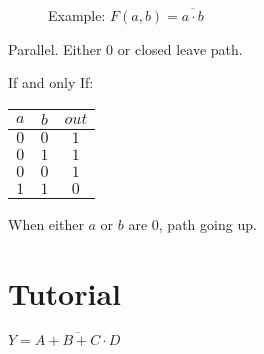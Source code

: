 \documentclass[a4paper,12pt]{article}
\begin{document}
\begin{figure}[hbt] 
\centering 



\label{NAND Gate} 

\end{figure} 

\begin{figure}[h]
\centering 



\label{NAND Gate} 

\caption{Example: $F(a, b) = \overline{a \cdot b}$}

\end{figure}

Parallel. Either $0$ or closed leave path.

If and only If:

\begin{tabular}{|c|c|c|}
\hline
$a$	&	$b$	&	$out$	\\
\hline
$0$	&	$0$	&	$1$	\\
\hline
$0$	&	$1$	&	$1$	\\
\hline
$0$	&	$0$	&	$1$	\\
\hline
$1$	&	$1$	&	$0$	\\
\hline
\end{tabular}

When either $a$ or $b$ are $0$, path going up.

\section*{Tutorial}

$Y = \overline{A + B + C \cdot D}$

\begin{figure}[h]
\centering 



\end{figure}
\end{document}

